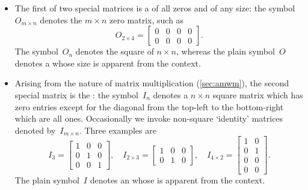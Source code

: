 \begin{itemize}
\item The first of two special matrices is a  of all zeros and of any size: the symbol~\(O_{m\times n}\) denotes the \(m\times n\) zero matrix, such as
\begin{equation*}
O_{2\times 4}=\begin{bmatrix} 0&0&0&0\\0&0&0&0 \end{bmatrix}.
\end{equation*}
The symbol~\(O_n\) denotes the square  of  \(n\times n\), whereas the plain symbol~\(O\) denotes a  whose size is apparent from the context.

\item Arising from the nature of matrix multiplication (\cref{sec:amwm}), the second special matrix is the : the symbol~\(I_n\) denotes a \(n\times n\) square matrix which has zero entries except for the diagonal from the top-left to the bottom-right which are all ones.
Occasionally we invoke non-square `identity' matrices denoted by~\(I_{m\times n}\).
Three examples are
\begin{equation*}
I_3=\begin{bmatrix} 1&0&0\\0&1&0\\0&0&1 \end{bmatrix},\quad
I_{2\times3}=\begin{bmatrix} 1&0&0\\0&1&0\end{bmatrix},\quad
I_{4\times2}=\begin{bmatrix} 1&0\\0&1\\0&0\\0&0\end{bmatrix}.
\end{equation*}
The plain symbol~\(I\) denotes an  whose  is apparent from the context.


\end{itemize}

